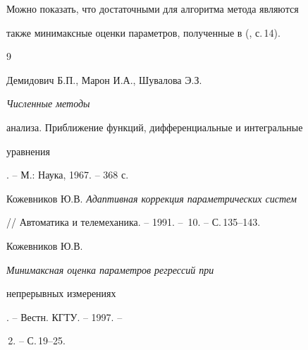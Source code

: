  


Можно показать, что достаточными для алгоритма метода являются 


также минимаксные оценки параметров, полученные в (\cite{3}, с.\,14). 


 


\begin{thebibliography}{9} 


 




Демидович Б.П., Марон И.А., Шувалова Э.З. {\em Численные методы 


анализа. Приближение функций, дифференциальные и интегральные


уравнения}. -- М.: Наука, 1967. -- 368 с. 




Кожевников Ю.В. {\em Адаптивная коррекция параметрических систем} 


// Автоматика и телемеханика. -- 1991. -- \No\,10. -- С.\,135--143. 




Кожевников Ю.В. {\em Минимаксная оценка параметров регрессий при 


непрерывных измерениях}. -- Вестн. КГТУ. -- 1997. -- 


\No\,2. -- С.\,19--25. 


 


\end{thebibliography} 


 


\vskip 2cm 


 






 


\label{end} 


 


